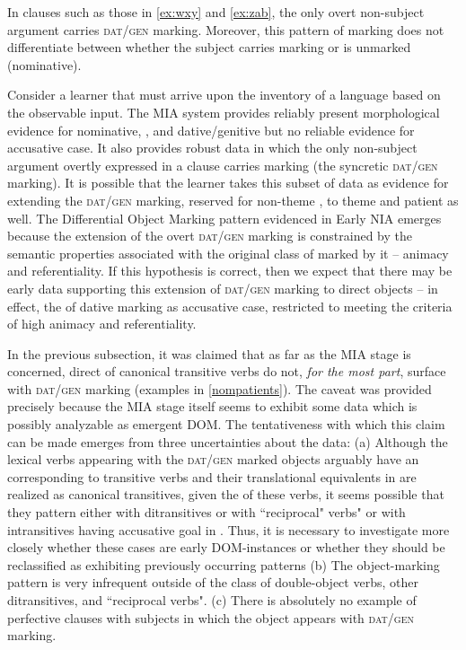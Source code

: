 \documentclass[output=paper,
modfonts
]{LSP/langsci}
\begin{document}
In clauses such as those  in \cref{ex:wxy} and \cref{ex:zab},  the only overt non-subject argument carries \textsc{dat/gen} marking. Moreover, this pattern of marking does not differentiate between whether the subject carries  marking or is unmarked (nominative). 

Consider a learner that must   arrive upon  the  inventory of a language based on the observable input. The MIA system provides reliably present morphological evidence   for nominative,  , and dative/genitive  but no reliable evidence for accusative case. It also provides robust data in which the only non-subject argument overtly expressed in a clause carries  marking (the syncretic \textsc{dat/gen} marking). It is possible that the learner takes this subset of data as evidence for extending the \textsc{dat/gen} marking, reserved for  non-theme , to theme and patient  as well. The Differential Object Marking pattern evidenced in Early NIA emerges because  the  extension of the overt \textsc{dat/gen}  marking is constrained by the semantic properties associated with the original class of  marked by it -- animacy and referentiality.
If this hypothesis is correct, then we expect that there may be early data supporting this extension of \textsc{dat/gen}  marking to direct objects -- in effect, the  of dative marking  as accusative case, restricted to  meeting the criteria of high animacy and referentiality.


In the previous subsection, it was claimed that    as far as the MIA stage is concerned,  direct  of canonical transitive verbs do not, \textit{for the most part}, surface with  \textsc{dat/gen} marking (examples in \cref{nompatients}). The caveat was provided precisely because the MIA stage itself seems to exhibit some  data which is possibly analyzable as emergent DOM. The tentativeness with which this claim can be made emerges from three uncertainties about the data: (a) Although the lexical verbs appearing with the \textsc{dat/gen} marked objects arguably have an  corresponding to transitive verbs and their translational equivalents in  are realized as  canonical transitives, given the  of these verbs,  it seems possible that they pattern either with ditransitives or with ``reciprocal" verbs" or with intransitives having accusative goal  in . Thus, it is necessary to investigate more closely whether these cases are early DOM-instances or whether they should be reclassified as exhibiting previously occurring patterns (b) The object-marking pattern   is very infrequent outside of the class of double-object verbs, other ditransitives, and ``reciprocal verbs". (c) There is absolutely no example of perfective clauses with  subjects in which the object appears with \textsc{dat/gen} marking. 
\end{document}
